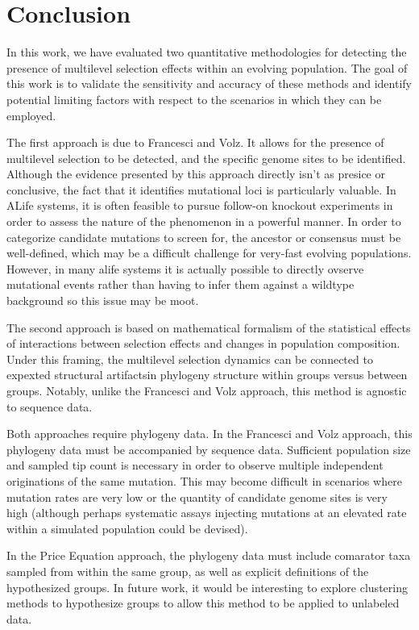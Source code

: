 \section{Conclusion} \label{sec:conclusion}

In this work, we have evaluated two quantitative methodologies for detecting the presence of multilevel selection effects within an evolving population.
The goal of this work is to validate the sensitivity and accuracy of these methods and identify potential limiting factors with respect to the scenarios in which they can be employed.

The first approach is due to Francesci and Volz.
It allows for the presence of multilevel selection to be detected, and the specific genome sites to be identified.
Although the evidence presented by this approach directly isn't as presice or conclusive, the fact that it identifies mutational loci is particularly valuable.
In ALife systems, it is often feasible to pursue follow-on knockout experiments in order to assess the nature of the phenomenon in a powerful manner.
In order to categorize candidate mutations to screen for, the ancestor or consensus must be well-defined, which may be a difficult challenge for very-fast evolving populations.
However, in many alife systems it is actually possible to directly ovserve mutational events rather than having to infer them against a wildtype background so this issue may be moot. 


The second approach is based on mathematical formalism of the statistical effects of interactions between selection effects and changes in population composition.
Under this framing, the multilevel selection dynamics can be connected to expexted structural artifactsin phylogeny structure within groups versus between groups.
Notably, unlike the Francesci and Volz approach, this method is agnostic to sequence data.

Both approaches require phylogeny data.
In the Francesci and Volz approach, this phylogeny data must be accompanied by sequence data.
Sufficient population size and sampled tip count is necessary in order to observe multiple independent originations of the same mutation.
This may become difficult in scenarios where mutation rates are very low or the quantity of candidate genome sites is very high (although perhaps systematic assays injecting mutations at an elevated rate within a simulated population could be devised).

In the Price Equation approach, the phylogeny data must include comarator taxa sampled from within the same group, as well as explicit definitions of the hypothesized groups.
In future work, it would be interesting to explore clustering methods to hypothesize groups to allow this method to be applied to unlabeled data.

